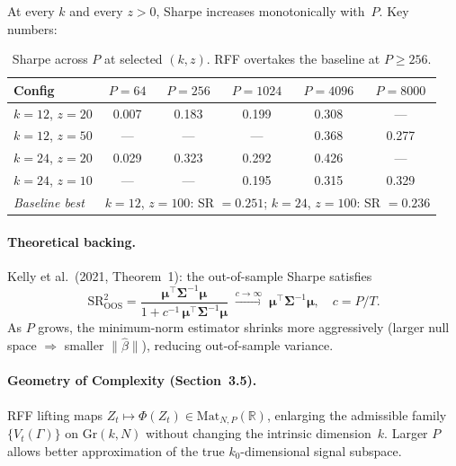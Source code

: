 \documentclass[11pt,a4paper]{article}
\begin{document}
At every $k$ and every $z > 0$, Sharpe increases monotonically with~$P$.  Key numbers:

\begin{table}[H]
\centering\small
\begin{tabular}{lccccc}
\toprule
Config & $P = 64$ & $P = 256$ & $P = 1024$ & $P = 4096$ & $P = 8000$ \\
\midrule
$k = 12$, $z = 20$ & 0.007 & 0.183 & 0.199 & 0.308 & --- \\
$k = 12$, $z = 50$ & --- & --- & --- & 0.368 & 0.277 \\
$k = 24$, $z = 20$ & 0.029 & 0.323 & 0.292 & 0.426 & --- \\
$k = 24$, $z = 10$ & --- & --- & 0.195 & 0.315 & 0.329 \\
\midrule
\textit{Baseline best} & \multicolumn{5}{c}{$k = 12$, $z = 100$: SR $= 0.251$; \quad $k = 24$, $z = 100$: SR $= 0.236$} \\
\bottomrule
\end{tabular}
\caption{Sharpe across $P$ at selected $(k, z)$.  RFF overtakes the baseline at $P \geq 256$.}
\end{table}

\paragraph{Theoretical backing.}
Kelly et al.\ (2021, Theorem~1): the out-of-sample Sharpe satisfies
\begin{equation}
  \mathrm{SR}_{\mathrm{OOS}}^2
  = \frac{\boldsymbol{\mu}^\top \boldsymbol{\Sigma}^{-1} \boldsymbol{\mu}}
         {1 + c^{-1}\,\boldsymbol{\mu}^\top \boldsymbol{\Sigma}^{-1} \boldsymbol{\mu}}
  \;\xrightarrow{c \to \infty}\;
  \boldsymbol{\mu}^\top \boldsymbol{\Sigma}^{-1} \boldsymbol{\mu},
  \quad c = P / T.
\end{equation}
As $P$ grows, the minimum-norm estimator shrinks more aggressively (larger null space $\Rightarrow$ smaller $\|\hat\beta\|$), reducing out-of-sample variance.

\paragraph{Geometry of Complexity (Section~3.5).}
RFF lifting maps $Z_t \mapsto \Phi(Z_t) \in \mathrm{Mat}_{N,P}(\mathbb{R})$, enlarging the admissible family $\{V_t(\Gamma)\}$ on $\mathrm{Gr}(k, N)$ without changing the intrinsic dimension~$k$.  Larger $P$ allows better approximation of the true $k_0$-dimensional signal subspace.
\end{document}
